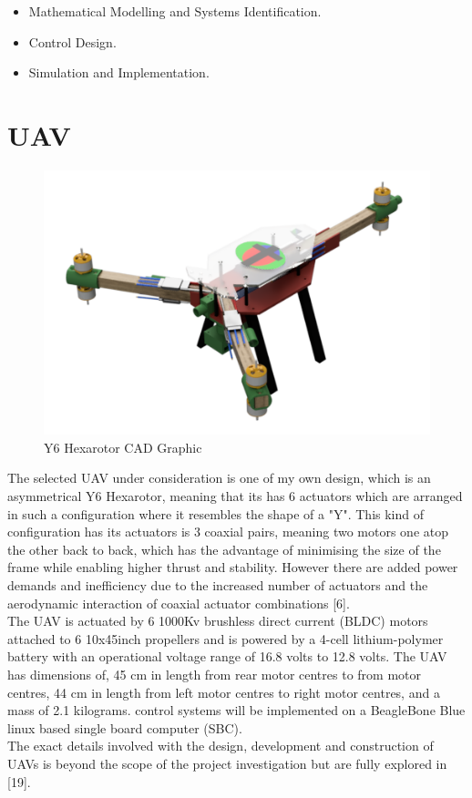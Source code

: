 \documentclass[12pt,a4paper,twoside]{report}
\begin{document}
		\begin{itemize}
			\item 
				Mathematical Modelling and Systems Identification.
			\item
				Control Design.
			\item
				Simulation and Implementation.
		\end{itemize}
				
		\section*{UAV}
			\begin{figure}[h!]
				\centering
				\includegraphics[width=0.6\linewidth]{Y6_Hexarotor2.png}
				\caption{Y6 Hexarotor CAD Graphic}
				\label{fig:Y6Hexarotor}
			\end{figure} 
		
			The selected UAV under consideration is one of my own design, which is an asymmetrical Y6 Hexarotor, meaning that its has 6 actuators which are arranged in such a configuration where it resembles the shape of  a "Y". This kind of configuration has its actuators is 3 coaxial pairs, meaning two motors one atop the other back to back, which has the advantage of minimising the size of the frame while enabling higher thrust and stability. However there are added power demands and inefficiency due to the increased number of actuators and the aerodynamic interaction of coaxial actuator combinations [6].
			\\
			The UAV is actuated by 6 1000Kv brushless direct current (BLDC) motors attached to 6 10x45inch propellers and is powered by a 4-cell lithium-polymer battery with an operational voltage range of 16.8 volts to 12.8 volts. The UAV has dimensions of, 45 cm in length from rear motor centres to from motor centres, 44 cm in length from left motor centres to right motor centres, and a mass of 2.1 kilograms. control systems will be implemented on a BeagleBone Blue linux based single board computer (SBC).
			\\
			The exact details involved with the design, development and construction of UAVs is beyond the scope of the project investigation but are fully explored in [19].
		  
\end{document}
